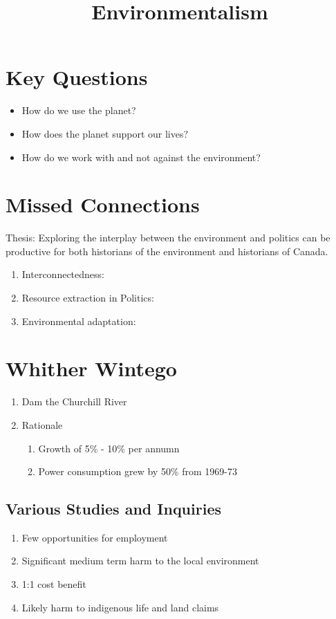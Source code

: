 \documentclass{article}
\title{Environmentalism}
\begin{document}
\maketitle
\section{Key Questions}
\begin{itemize}
	\item How do we use the planet?
	\item How does the planet support our lives?
	\item How do we work with and not against the environment?
\end{itemize}

\section{Missed Connections}
	Thesis:  
		Exploring the interplay between the environment and politics can
		be productive for both historians of the environment and 
		historians of Canada.

	\begin{enumerate}
	\item Interconnectedness:  

	\item Resource extraction in Politics:

	\item Environmental adaptation:
	\end{enumerate}
	
\section{Whither Wintego}
	\begin{enumerate}
		\item	Dam the Churchill River

		\item 	Rationale
		\begin{enumerate}
			\item Growth of 5\% - 10\% per annumn
			\item Power consumption grew by 50\% from 1969-73
		\end{enumerate}
	\end{enumerate}

\subsection{Various Studies and Inquiries}
	\begin{enumerate}
		\item	Few opportunities for employment
		\item	Significant medium term harm to the local environment
		\item	1:1 cost benefit
		\item	Likely harm to indigenous life and land claims
	\end{enumerate}
\end{document}
